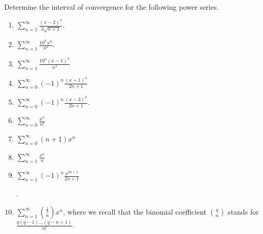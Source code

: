 Determine the interval of convergence for the following power series. 
\begin{enumerate}[ref={\fcProblemRef}]
\item \label{problemIntervalConvergence_sum(x-2)^n/(3sqrt(n+1))} $\displaystyle \sum_{n=1}^{\infty} \frac{(x-2)^n}{3\sqrt{n+1}}.$

\answer{$x\in [1, 3)$}
\item $\displaystyle \sum \limits_{n= 1}^{\infty} \frac{ 10^nx^n}{n^3}$.

\item $\displaystyle \sum \limits_{n= 1}^{\infty} \frac{ 10^n(x-1)^n}{n^3}$

\item $\displaystyle \sum\limits_{n=0}^{\infty}(-1)^n \frac{(x+1)^n }{ 2n+1} $

\answer{$x\in (-2, 0]$}
\item $\displaystyle \sum\limits_{n=0}^{\infty}(-1)^n \frac{(x- 3)^n }{ 2n+1} $.

\answer{$x\in (2, 4]$}
\item 
$\displaystyle \sum\limits_{n=0}^{\infty} \frac{x^n}{n!}$

\item 
$\displaystyle \sum\limits_{n=0}^{\infty} (n+1)x^n $

\item 
$\displaystyle \sum\limits_{n=1}^{\infty} \frac{x^n}{n}$

\answer{converges for $|x|\in[-1,1)$.}
\item 
$\displaystyle\sum\limits_{n=1}^{\infty} (-1)^n\frac{x^{2n+1}}{2n+1}$

\answer{converges for $|x|\in (-1, 1]$}.
\item 
$\displaystyle \sum\limits_{n=1}^{\infty} \binom{\frac{1}{2}}{n}x^{n}$, where we recall that the binomial coefficient $\displaystyle \binom{q}{n}$ stands for $\displaystyle\frac{q (q-1)\dots (q-n+1)}{n!}$.

\answer{converges for $x\in (-1,1]$. } 
\end{enumerate}